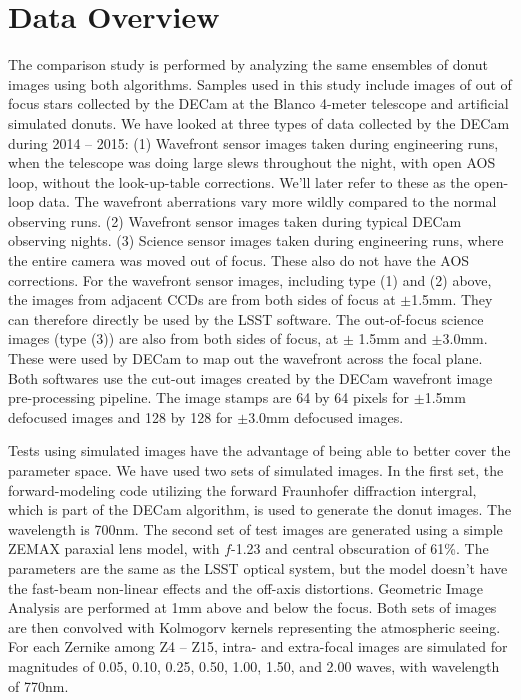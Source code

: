 \documentclass[]{spie}  %
\begin{document}
\section{Data Overview}
\label{sec:data}

The comparison study is performed by analyzing the same ensembles of donut images using both algorithms.
Samples used in this study include images of out of focus stars collected by the DECam at the Blanco 4-meter telescope and artificial simulated donuts. 
We have looked at three types of data collected by the DECam during 2014 -- 2015: (1) Wavefront sensor images taken during engineering runs, when the telescope was doing large slews throughout the night, with open AOS loop, without the look-up-table corrections. We'll later refer to these as the open-loop data.
The wavefront aberrations vary more wildly compared to the normal observing runs.  
(2) Wavefront sensor images taken during typical DECam observing nights. 
(3) Science sensor images taken during engineering runs, where the entire camera was moved out of focus. 
These also do not have the AOS corrections.
For the wavefront sensor images, including type (1) and (2) above, the images from adjacent CCDs are from both sides of focus at $\pm$1.5mm. They can therefore directly be used by the LSST software.
The out-of-focus science images (type (3)) are also from both sides of focus, at $\pm$ 1.5mm and $\pm$3.0mm. These were used by DECam to map out the wavefront across the focal plane.
Both softwares use the cut-out images created by the DECam wavefront image pre-processing pipeline.
The image stamps are 64 by 64 pixels for $\pm$1.5mm defocused images and 128 by 128 for $\pm$3.0mm defocused images.

Tests using simulated images have the advantage of being able to better cover the parameter space.
We have used two sets of simulated images. 
In the first set, the forward-modeling code utilizing the forward Fraunhofer diffraction intergral, which is part of the DECam algorithm, is used to generate the donut images. The wavelength is 700nm.
The second set of test images are generated using a simple ZEMAX paraxial lens model, with $f$-1.23 and central obscuration of 61\%. The parameters are the same as the LSST optical system, but the model doesn't have the fast-beam non-linear effects and the off-axis distortions. 
Geometric Image Analysis are performed at 1mm above and below the focus.
Both sets of images are then convolved with Kolmogorv kernels representing the atmospheric seeing.
For each Zernike among Z4 -- Z15, intra- and extra-focal images are simulated for magnitudes of 
0.05, 0.10, 0.25, 0.50, 1.00, 1.50, and 2.00 waves, with wavelength of 770nm.
\end{document}
